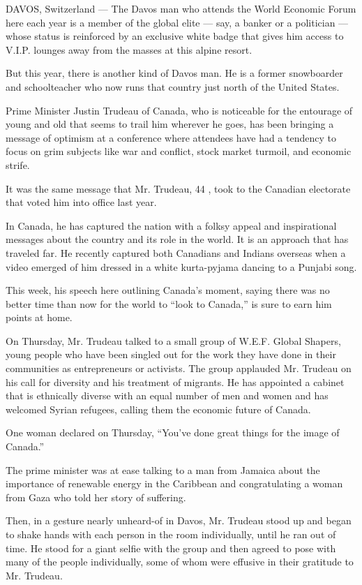 DAVOS, Switzerland --- The Davos man who attends the World Economic
Forum here each year is a member of the global elite --- say, a banker
or a politician --- whose status is reinforced by an exclusive white
badge that gives him access to V.I.P. lounges away from the masses at
this alpine resort.

But this year, there is another kind of Davos man. He is a former
snowboarder and schoolteacher who now runs that country just north of
the United States.

Prime Minister Justin Trudeau of Canada, who is noticeable for the
entourage of young and old that seems to trail him wherever he goes, has
been bringing a message of optimism at a conference where attendees have
had a tendency to focus on grim subjects like war and conflict, stock
market turmoil, and economic strife.

It was the same message that Mr. Trudeau, 44 , took to the Canadian
electorate that voted him into office last year.

In Canada, he has captured the nation with a folksy appeal and
inspirational messages about the country and its role in the world. It
is an approach that has traveled far. He recently captured both
Canadians and Indians overseas when a video emerged of him dressed in a
white kurta-pyjama dancing to a Punjabi song.

This week, his speech here outlining Canada's moment, saying there was
no better time than now for the world to ``look to Canada,'' is sure to
earn him points at home.

On Thursday, Mr. Trudeau talked to a small group of W.E.F. Global
Shapers, young people who have been singled out for the work they have
done in their communities as entrepreneurs or activists. The group
applauded Mr. Trudeau on his call for diversity and his treatment of
migrants. He has appointed a cabinet that is ethnically diverse with an
equal number of men and women and has welcomed Syrian refugees, calling
them the economic future of Canada.

One woman declared on Thursday, ``You've done great things for the image
of Canada.''

The prime minister was at ease talking to a man from Jamaica about the
importance of renewable energy in the Caribbean and congratulating a
woman from Gaza who told her story of suffering.

Then, in a gesture nearly unheard-of in Davos, Mr. Trudeau stood up and
began to shake hands with each person in the room individually, until he
ran out of time. He stood for a giant selfie with the group and then
agreed to pose with many of the people individually, some of whom were
effusive in their gratitude to Mr. Trudeau.

